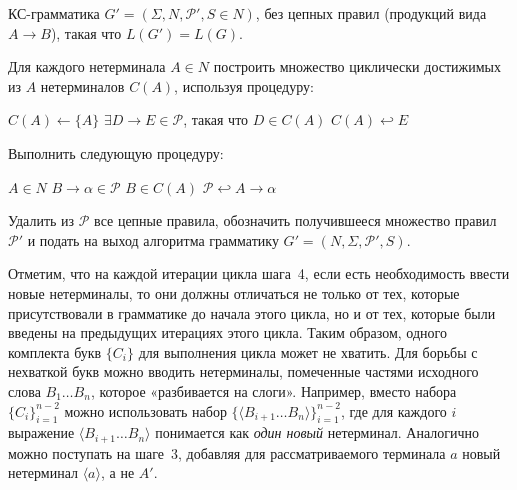 {КС-грамматика
$G'=(\Sigma, N, \mathcal P', S \in N)$, без цепных правил (продукций вида $A \to B$), такая что $L(G')=L(G)$.}
{
  \item Для каждого нетерминала $A \in N$ построить множество циклически
  достижимых из $A$ нетерминалов $C(A)$, используя процедуру:
  \begin{codebox}
  \li   $C(A) \gets \{ A \}$
  \li   \While $\exists D \to E \in \mathcal P$, такая что $D \in C(A)$
  \zi   \Do
        $C(A) \hookleftarrow E$
        \End
  \end{codebox}
  \item Выполнить следующую процедуру:
  \begin{codebox}
  \zi   \For $A \in N$
  \zi   \Do \For $B \to \alpha \in \mathcal P$
  \zi       \Do \If $B \in C(A)$
  \zi           \Then $\mathcal P \hookleftarrow A \to \alpha$
                \End
            \End
        \End
  \end{codebox}
  \item Удалить из $\mathcal P$ все цепные правила, обозначить
  получившееся множество правил $\mathcal P'$ и подать на выход алгоритма
  грамматику $G' = (N, \Sigma, \mathcal P', S)$.
}

\begin{myremark}
Отметим, что на каждой итерации цикла шага~4, если
есть необходимость ввести новые не\-тер\-ми\-на\-лы, то они должны отличаться не только
от тех, которые присутствовали в грамматике до начала этого цикла, но и от тех,
которые были введены на предыдущих итерациях этого цикла. Таким образом, одного
комплекта букв $\{C_i\}$ для выполнения цикла может не хватить. Для борьбы с
нехваткой букв можно вводить нетерминалы, помеченные частями исходного слова
$B_1\ldots B_n$, которое «разбивается на слоги». Например, вместо набора
$\{C_i\}_{i=1}^{n-2}$ можно использовать набор $\{ \langle B_{i+1}\ldots B_n
\rangle \}_{i=1}^{n-2}$, где для каждого $i$ выражение $\langle B_{i+1}\ldots B_n \rangle$
понимается как \emph{один новый} нетерминал. Аналогично можно поступать на
шаге~3, добавляя для рассматриваемого терминала $a$ новый
нетерминал $\langle a \rangle$, а не $A'$.
\end{myremark}

